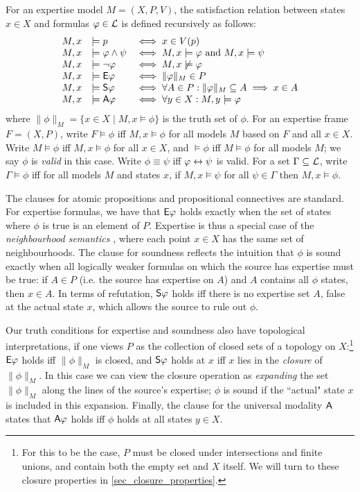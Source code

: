 For an expertise model $M = (X, P, V)$, the satisfaction relation between
states $x \in X$ and formulas $\phi \in \cL$ is defined recursively
as follows:
\[
    \begin{array}{lll}
     M, x &\models p &\iff x \in V(p) \\
     M, x &\models \phi \land \psi &\iff M, x \models \phi \text{ and } M, x
         \models \psi \\
     M, x &\models \neg\phi &\iff M, x \not\models \phi \\
     M, x &\models \E\phi &\iff \|\phi\|_M \in P \\
     M, x &\models \S\phi &\iff \forall A \in P: \|\phi\|_M \subseteq A \implies
         x \in A \\
     M, x &\models \A\phi &\iff \forall y \in X: M, y \models \phi
    \end{array}
\]
where $\|\phi\|_M = \{x \in X \mid M, x \models \phi\}$ is the truth set
of $\phi$. For an expertise frame $F = (X, P)$, write $F
\models \phi$ iff $M, x \models \phi$ for all models $M$ based on
$F$ and all $x \in X$. Write $M \models \phi$ iff
$M, x \models \phi$ for all $x \in X$, and $\models \phi$ iff
$M \models \phi$ for all models $M$; we say $\phi$ is \emph{valid}
in this case. Write $\phi \equiv \psi$ iff $\phi \liff \psi$ is
valid. For a set $\Gamma \subseteq \cL$, write $\Gamma \models
\phi$ iff for all models $M$ and states $x$, if $M, x \models
\psi$ for all $\psi \in \Gamma$ then $M, x \models \phi$.

The clauses for atomic propositions and propositional connectives are standard.
For expertise formulas, we have that $\E\phi$ holds exactly when the set of
states where $\phi$ is true is an element of $P$. Expertise is thus a special
case of the \emph{neighbourhood semantics}
\citep{Scott1970,montague1970universal,pacuit2017neighborhood}, where each
point $x \in X$ has the same set of neighbourhoods. The clause for soundness
reflects the intuition that $\phi$ is sound exactly when all logically weaker
formulas on which the source has expertise must be true: if $A \in P$ (i.e. the
source has expertise on $A$) and $A$ contains all $\phi$ states, then $x \in
A$. In terms of refutation, $\S\phi$ holds iff there is no expertise set $A$,
false at the actual state $x$, which allows the source to rule out $\phi$.

Our truth conditions for expertise and soundness also have topological
interpretations, if one views $P$ as the collection of closed sets of a
topology on $X$:\footnote{For this to be the case, $P$ must be closed under
intersections and finite unions, and contain both the empty set and $X$ itself.
We will turn to these closure properties in \cref{sec_closure_properties}.} $\E\phi$ holds
iff $\|\phi\|_M$ is closed, and $\S\phi$ holds at $x$ iff $x$ lies in the
\emph{closure} of $\|\phi\|_M$.\footnotemark{} In this case we can view the
closure operation as \emph{expanding} the set $\|\phi\|_M$ along the lines of
the source's expertise; $\phi$ is sound if the ``actual" state $x$ is included
in this expansion.
%
Finally, the clause for the universal modality $\A$ states that $\A\phi$ holds
iff $\phi$ holds at all states $y \in X$.

